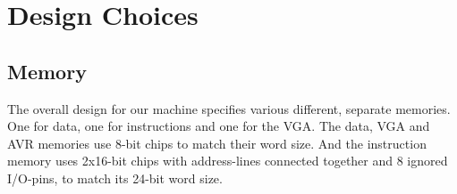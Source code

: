 \section {Design Choices}

\subsection {Memory}
The overall design for our machine specifies various different, separate memories. One for data,
one for instructions and one for the VGA. The data, VGA and AVR memories use 8-bit chips to match
their word size. And the instruction memory uses 2x16-bit chips with address-lines connected
together and 8 ignored I/O-pins, to match its 24-bit word size.
\begin{comment}
Tok dette ut siden dette allerede er diskutert tidligere i rapporten
~Mads

One of the
earliest design choices that led to this was the decision to have separate instruction/data-memories.
The reasoning behind this choice being that we could avoid the bottleneck that would be introduced
from sharing memories.
\end{comment}

\begin{comment}
Skrev om for å skille ut prosess
~Mads

Since the requirements for the data/instruction memories differed in both size and word-width 
we wound up with not only separate, but also different chips for this purpose (The data-memory required
8-bit words, the instruction-width was 24-bit, and since we wanted to avoid using multiple memory accesses
to get a complete instruction, we needed a wide enough memory chip for that purpose. 24-bit chips were out of
production, and 32-bit memory was too expensive, thus the solution became 2x16-bit chips with their address-lines
connected together and 8 ignored I/O-pins, effectively making them a 24-bit memory).

Since we wanted to reduce the sharing of memories as much as possible, we also needed a separate memory for
our \ac{VGA} controller, as that needed to read it's buffer as fast as possible without interfering with the speed
of the rest of the system. This called for a memory that was big enough to hold at least a full screen-frame,
at 8-bit per pixel (since each pixel is an 8-bit greyscale pixel).

To reduce the possibility of having too slow data-access from the AVR, an extra memory was added to work as
a buffer for the AVR as well. This design choice was made {\em after} ordering, which meant that we had to choose from
the chips we had already ordered to fit this purpose. Since this was intended to carry data intended for the rest
of the system, and as the rest of the system is working with data in 8-bit bytes, we ended up using one of the
extra chips ordered as \ac{VGA} memory for this purpose.

Forresten, da vart det så kort at jeg bare tødde det in i avsnittet over. Må få jobbet prosess-delene inn igjen et eller annet sted!
~Mads
\end{comment}

